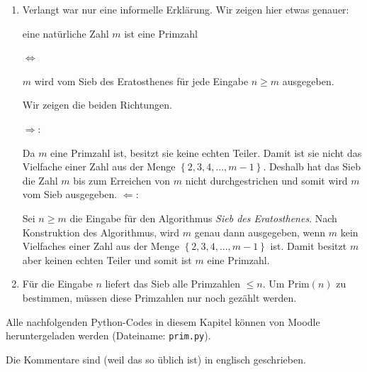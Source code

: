 \begin{Answer}
\begin{enumerate}[label=(\alph*)]
\item Verlangt war nur eine informelle Erklärung. Wir zeigen hier etwas genauer:
\begin{center}
    eine natürliche Zahl $m$ ist eine Primzahl
    
    $\Longleftrightarrow$ 
    
    $m$ wird vom Sieb des Eratosthenes für jede Eingabe $n\geq m$ ausgegeben.
\end{center}
Wir zeigen die beiden Richtungen.

$\Rightarrow$:

Da $m$ eine Primzahl ist, besitzt sie keine echten Teiler. Damit ist sie nicht das Vielfache einer Zahl aus der Menge $\left\{2,3,4, ..., m-1\right\}$. Deshalb hat das Sieb die Zahl $m$ bis zum Erreichen von $m$ nicht durchgestrichen und somit wird $m$ vom Sieb ausgegeben.
$\Leftarrow$:

Sei $n\geq m$ die Eingabe für den Algorithmus \textit{Sieb des Eratosthenes}. Nach Konstruktion des Algorithmus, wird $m$ genau dann ausgegeben, wenn $m$ kein Vielfaches einer Zahl aus der Menge $\left\{2,3,4, ..., m-1\right\}$ ist. Damit besitzt $m$ aber keinen echten Teiler und somit ist $m$ eine Primzahl.
\item Für die Eingabe $n$ liefert das Sieb alle Primzahlen $\leq n$. Um $\text{Prim}(n)$ zu bestimmen, müssen diese Primzahlen nur noch gezählt werden.
\end{enumerate}
\end{Answer}

\clearpage

Alle nachfolgenden Python-Codes in diesem Kapitel können von Moodle heruntergeladen werden (Dateiname: {\tt prim.py}).

Die Kommentare sind (weil das so üblich ist) in englisch geschrieben.

